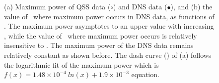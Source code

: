 \begin{figure}
    \caption{(a) Maximum power of QSS data ($\circ$) and DNS data ($\bullet$), and (b) the value of \massdamp\ 
        where maximum power occurs in DNS data, as functions of \massstiff.
           The maximum power asymptotes to an upper
        value with increasing \massstiff, while the value of \massdamp\
        where maximum power occurs is relatively insensitive to
        \massstiff. The maximum power of the DNS data remains relatively constant as shown before. The dash curve (\protect\dashedrule) of (a) follows the logarithmic fit of the maximum power which is $f(x)=1.48 \times 10^{-4} \ ln(x) + 1.9 \times 10^{-3} $ equation.}

    \label{fig:max_power}
\end{figure}

